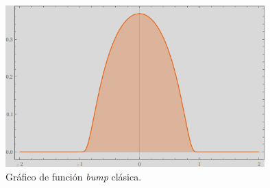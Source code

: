 \documentclass[spanish, fleqn]{article}
\begin{document}
\begin{description}
\begin{enumerate}
    \begin{figure}[htpb!]
    \centering
    \includegraphics[width=10cm]{bump}
    \caption{Gráfico de función \textit{bump} clásica.}
    \label{fig:cbump}
    \end{figure}


\end{enumerate}
\end{description}
\end{document}

